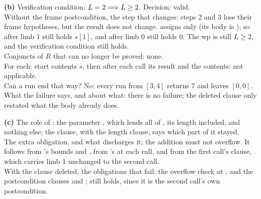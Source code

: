 \documentclass[11pt]{article}
\begin{document}
\begin{answer}
\textbf{(b)} Verification condition: $L = 2 \Longrightarrow L \geq 2$. \quad Decision:
valid. \\
Without the frame postcondition, the step that changes: steps 2 and 3 lose
their frame hypotheses, but the result does not change.  assigns
only  (its body is ), so after
 limb 1 still holds $s[1]$, and after  limb
0 still holds $0$. The wp is still $L \geq 2$, and the verification condition
still holds. \\
Conjuncts of $R$ that can no longer be proved: none. \\
For each: start contents $s$, then after each call its result and the
contents: not applicable. \\
Can a run end that way? No: every run from $[3, 4]$ returns $7$ and leaves
$[0, 0]$. \\
What the failure says, and about what: there is no failure; the deleted
clause only restated what the body already does.

\textbf{(c)} The role of : the parameter ,
which lends all of , its length included, and nothing else; the
 clause, with the length clause, says which part of it stayed. \\
The extra obligation, and what discharges it: the  addition
 must not overflow. It follows from 's bounds
 and , from 's
 at each call, and from the first call's
 clause, which carries limb 1 unchanged to the second call. \\
With the  clause deleted, the obligations that fail: the overflow
check at , and the postcondition clauses
 and ;
 still holds, since it is the second call's own
postcondition.
\end{answer}

\end{document}
